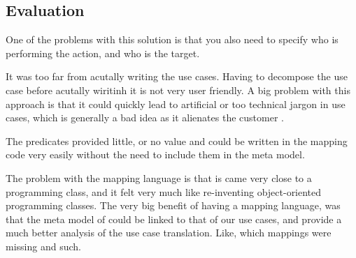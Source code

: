 \subsection{Evaluation}
One of the problems with this solution is that you also need to specify who is performing the action, and who is the target.

It was too far from acutally writing the use cases. Having to decompose the use case before acutally wiritinh it is not very user friendly. 
A big problem with this approach is that it could quickly lead to artificial or too technical jargon in use cases, which is generally a bad idea as it alienates the customer \cite{christel1992}.

The predicates provided little, or no value and could be written in the mapping code very easily without the need to include them in the meta model.

The problem with the mapping language is that is came very close to a programming class, and it felt very much like re-inventing object-oriented programming classes. The very big benefit of having a mapping language, was that the meta model of could be linked to that of our use cases, and provide a much better analysis of the use case translation. Like, which mappings were missing and such.
